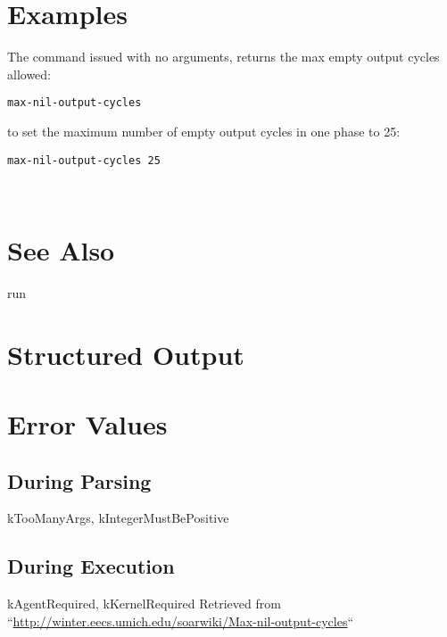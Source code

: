 \documentclass[10pt]{article}
\begin{document}
\section*{ Examples }


 The command issued with no arguments, returns the max empty output cycles allowed: \begin{verbatim}
max-nil-output-cycles 

\end{verbatim}



 to set the maximum number of empty output cycles in one phase to 25: \begin{verbatim}
max-nil-output-cycles 25 

\end{verbatim}



 \\ 

\section*{ See Also }


 run
\section*{ Structured Output }
\section*{ Error Values }
\subsection*{ During Parsing }


 kTooManyArgs, kIntegerMustBePositive
\subsection*{ During Execution }


 kAgentRequired, kKernelRequired Retrieved from ``\url{http://winter.eecs.umich.edu/soarwiki/Max-nil-output-cycles}``
\end{document}
